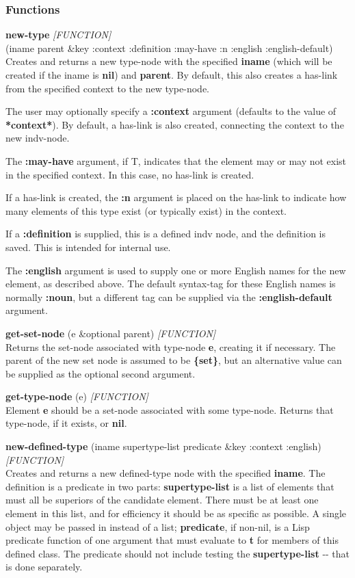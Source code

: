 \documentclass[titlepage,twoside,openright,11pt]{article}
\begin{document}
\subsubsection{Functions}\label{functions-2}

\textbf{new-type} \emph{{[}FUNCTION{]}\\
}(iname parent \&key :context :definition :may-have :n :english
:english-default)\\
\textbf{\hfill\break
}Creates and returns a new type-node with the specified \textbf{iname}
(which will be created if the iname is \textbf{nil}) and
\textbf{parent}. By default, this also creates a has-link from the
specified context to the new type-node.

The user may optionally specify a \textbf{:context} argument (defaults
to the value of \textbf{*context*}). By default, a has-link is also
created, connecting the context to the new indv-node.

The \textbf{:may-have} argument, if T, indicates that the element may or
may not exist in the specified context. In this case, no has-link is
created.

If a has-link is created, the \textbf{:n} argument is placed on the
has-link to indicate how many elements of this type exist (or typically
exist) in the context.

If a \textbf{:definition} is supplied, this is a defined indv node, and
the definition is saved. This is intended for internal use.

The \textbf{:english} argument is used to supply one or more English
names for the new element, as described above. The default syntax-tag
for these English names is normally \textbf{:noun}, but a different tag
can be supplied via the \textbf{:english-default} argument.

\textbf{get-set-node} (e \&optional parent) \emph{{[}FUNCTION{]}\\
}Returns the set-node associated with type-node \textbf{e}, creating it
if necessary. The parent of the new set node is assumed to be
\textbf{\{set\}}, but an alternative value can be supplied as the
optional second argument.

\textbf{get-type-node} (e) \emph{{[}FUNCTION{]}\\
}Element \textbf{e} should be a set-node associated with some type-node.
Returns that type-node, if it exists, or \textbf{nil}.

\textbf{new-defined-type} (iname supertype-list predicate \&key :context
:english) \emph{{[}FUNCTION{]}}\\
Creates and returns a new defined-type node with the specified
\textbf{iname}. The definition is a predicate in two parts:
\textbf{supertype-list} is a list of elements that must all be superiors
of the candidate element. There must be at least one element in this
list, and for efficiency it should be as specific as possible. A single
object may be passed in instead of a list; \textbf{predicate}, if
non-nil, is a Lisp predicate function of one argument that must evaluate
to \textbf{t} for members of this defined class. The predicate should
not include testing the \textbf{supertype-list} -\/- that is done
separately.
\end{document}
